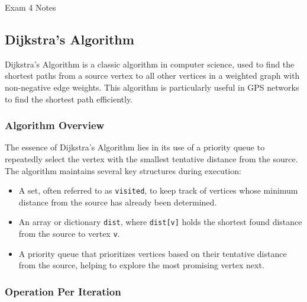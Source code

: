 \begin{examnotes}{Exam 4 Notes}
    \subsection*{Dijkstra's Algorithm}

    Dijkstra's Algorithm is a classic algorithm in computer science, used to find the shortest paths from a source vertex to all other vertices in a weighted graph with non-negative edge weights. 
    This algorithm is particularly useful in GPS networks to find the shortest path efficiently.
    
    \subsubsection*{Algorithm Overview}
    
    The essence of Dijkstra's Algorithm lies in its use of a priority queue to repeatedly select the vertex with the smallest tentative distance from the source. The algorithm maintains several 
    key structures during execution:
    \begin{itemize}
        \item A set, often referred to as \texttt{visited}, to keep track of vertices whose minimum distance from the source has already been determined.
        \item An array or dictionary \texttt{dist}, where \texttt{dist[v]} holds the shortest found distance from the source to vertex \texttt{v}.
        \item A priority queue that prioritizes vertices based on their tentative distance from the source, helping to explore the most promising vertex next.
    \end{itemize}
    
    \subsubsection*{Operation Per Iteration}
    

\end{examnotes}
